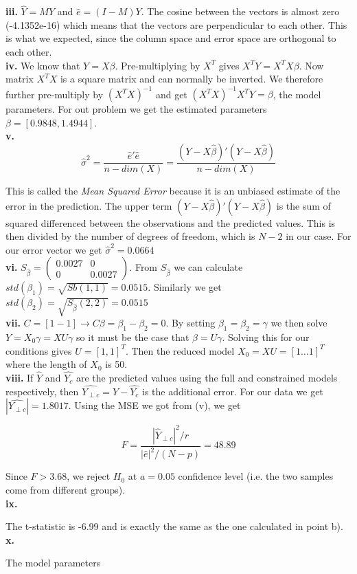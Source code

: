 \documentclass[12pt,a4paper,oneside]{report}
\begin{document}
                 
\textbf{iii.} $\hat{Y} = MY $ and $\hat{e} = (I-M)Y $. The cosine between the vectors is almost zero (-4.1352e-16) which means that the vectors are perpendicular to each other. This is what we expected, since the column space and error space are orthogonal to each other.\\

\textbf{iv.} We know that $Y = X\beta$. Pre-multiplying by $X^T$ gives $X^TY = X^TX\beta$. Now matrix $X^TX$ is a square matrix and can normally be inverted. We therefore further pre-multiply by $(X^TX)^{-1}$ and get $(X^TX)^{-1}X^TY = \beta$, the model parameters. For out problem we get the estimated parameters $\beta = [0.9848, 1.4944]$.\\

\textbf{v.} $$\hat{\sigma}^2 = \frac{\hat{e}'\hat{e}}{n - dim(X)} = \frac{(Y - X\hat{\beta})'(Y - X\hat{\beta})}{n - dim(X)}$$

This is called the \emph{Mean Squared Error} because it is an unbiased estimate of the error in the prediction. The upper term $(Y - X\hat{\beta})'(Y - X\hat{\beta})$ is the sum of squared differenced between the observations and the predicted values. This is then divided by the number of degrees of freedom, which is $N - 2$ in our case. For our error vector we get $\hat{\sigma}^2 = 0.0664$\\

\textbf{vi.} $S_{\hat{\beta}} = \begin{pmatrix}
0.0027 & 0\\
0 & 0.0027
\end{pmatrix}$. From $S_{\hat{\beta}}$ we can calculate $std(\beta_1) = \sqrt{Sb(1,1)} = 0.0515$. Similarly we get  $std(\beta_2) = \sqrt{S_{\hat{\beta}}(2,2)} = 0.0515$\\

\textbf{vii.} $C = [1 -1] \to C\beta = \beta_1 - \beta_2 = 0$. By setting $\beta_1 = \beta_2 = \gamma$ we then solve $Y = X_0\gamma = XU\gamma$ so it must be the case that $\beta = U\gamma$. Solving this for our conditions gives $U = [1, 1]^T$. Then the reduced model $X_0 = XU = [1 \dots 1]^T $ where the length of $X_0$ is 50. \\


\textbf{viii.} If $\hat{Y}$ and $\hat{Y_c}$ are the predicted values using the full and constrained models respectively, then $\hat{Y_{\perp c}} = \hat{Y} - \hat{Y_c}$ is the additional error. For our data we get $|\hat{Y_{\perp c}}| = 1.8017$. Using the MSE we got from (v), we get 

$$F = \frac{|\hat{Y}_{\perp c}|^2 / r}{|\hat{e}|^2 / (N - p)} = 48.89$$

Since $F > 3.68$, we reject $H_0$ at $a = 0.05$ confidence level (i.e. the two samples come from different groups).\\

\textbf{ix.}

The t-statistic is -6.99 and is exactly the same as the one calculated in point b). \\

\textbf{x. }

The model parameters 
\end{document}
